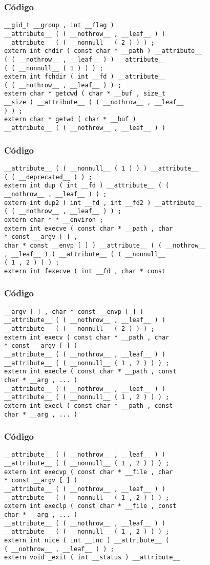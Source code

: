 \documentclass{beamer}
\begin{document}
\begin{frame}[fragile]
\frametitle{C\'odigo}
\begin{verbatim}
__gid_t __group , int __flag ) 
__attribute__ ( ( __nothrow__ , __leaf__ ) ) 
__attribute__ ( ( __nonnull__ ( 2 ) ) ) ; 
extern int chdir ( const char * __path ) __attribute__ 
( ( __nothrow__ , __leaf__ ) ) __attribute__ 
( ( __nonnull__ ( 1 ) ) ) ; 
extern int fchdir ( int __fd ) __attribute__ 
( ( __nothrow__ , __leaf__ ) ) ; 
extern char * getcwd ( char * __buf , size_t 
__size ) __attribute__ ( ( __nothrow__ , __leaf__ 
) ) ; 
extern char * getwd ( char * __buf ) 
__attribute__ ( ( __nothrow__ , __leaf__ ) ) 
\end{verbatim}
\end{frame}
\begin{frame}[fragile]
\frametitle{C\'odigo}
\begin{verbatim}
__attribute__ ( ( __nonnull__ ( 1 ) ) ) __attribute__ 
( ( __deprecated__ ) ) ; 
extern int dup ( int __fd ) __attribute__ ( ( 
__nothrow__ , __leaf__ ) ) ; 
extern int dup2 ( int __fd , int __fd2 ) __attribute__ 
( ( __nothrow__ , __leaf__ ) ) ; 
extern char * * __environ ; 
extern int execve ( const char * __path , char 
* const __argv [ ] , 
char * const __envp [ ] ) __attribute__ ( ( __nothrow__ 
, __leaf__ ) ) __attribute__ ( ( __nonnull__ 
( 1 , 2 ) ) ) ; 
extern int fexecve ( int __fd , char * const 
\end{verbatim}
\end{frame}
\begin{frame}[fragile]
\frametitle{C\'odigo}
\begin{verbatim}
__argv [ ] , char * const __envp [ ] ) 
__attribute__ ( ( __nothrow__ , __leaf__ ) ) 
__attribute__ ( ( __nonnull__ ( 2 ) ) ) ; 
extern int execv ( const char * __path , char 
* const __argv [ ] ) 
__attribute__ ( ( __nothrow__ , __leaf__ ) ) 
__attribute__ ( ( __nonnull__ ( 1 , 2 ) ) ) ; 
extern int execle ( const char * __path , const 
char * __arg , ... ) 
__attribute__ ( ( __nothrow__ , __leaf__ ) ) 
__attribute__ ( ( __nonnull__ ( 1 , 2 ) ) ) ; 
extern int execl ( const char * __path , const 
char * __arg , ... ) 
\end{verbatim}
\end{frame}
\begin{frame}[fragile]
\frametitle{C\'odigo}
\begin{verbatim}
__attribute__ ( ( __nothrow__ , __leaf__ ) ) 
__attribute__ ( ( __nonnull__ ( 1 , 2 ) ) ) ; 
extern int execvp ( const char * __file , char 
* const __argv [ ] ) 
__attribute__ ( ( __nothrow__ , __leaf__ ) ) 
__attribute__ ( ( __nonnull__ ( 1 , 2 ) ) ) ; 
extern int execlp ( const char * __file , const 
char * __arg , ... ) 
__attribute__ ( ( __nothrow__ , __leaf__ ) ) 
__attribute__ ( ( __nonnull__ ( 1 , 2 ) ) ) ; 
extern int nice ( int __inc ) __attribute__ ( 
( __nothrow__ , __leaf__ ) ) ; 
extern void _exit ( int __status ) __attribute__ 
\end{verbatim}
\end{frame}
\end{document}
